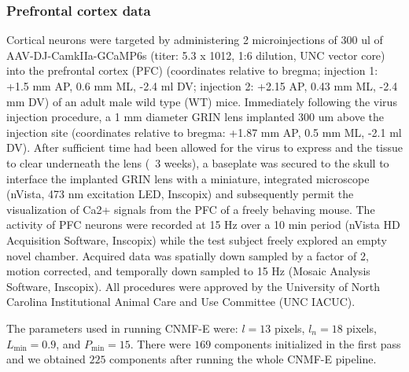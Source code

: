\documentclass[9pt,lineno]{elife}
\begin{document}

\subsubsection{Prefrontal cortex data}
Cortical neurons were targeted by administering 2 microinjections of 300 ul of AAV-DJ-CamkIIa-GCaMP6s (titer: 5.3 x 1012, 1:6 dilution, UNC vector core) into the prefrontal cortex (PFC) (coordinates relative to bregma; injection 1: +1.5 mm AP, 0.6 mm ML, -2.4 ml DV; injection 2: +2.15 AP, 0.43 mm ML, -2.4 mm DV) of an adult male wild type (WT) mice. Immediately following the virus injection procedure, a 1 mm diameter GRIN lens implanted 300 um above the injection site (coordinates relative to bregma: +1.87 mm AP, 0.5 mm ML, -2.1 ml DV). After sufficient time had been allowed for the virus to express and the tissue to clear underneath the lens (~3 weeks), a baseplate was secured to the skull to interface the implanted GRIN lens with a miniature, integrated microscope (nVista, 473 nm excitation LED, Inscopix) and subsequently permit the visualization of Ca2+ signals from the PFC of a freely behaving mouse. The activity of PFC neurons were recorded at 15 Hz over a 10 min period (nVista HD Acquisition Software, Inscopix) while the test subject freely explored an empty novel chamber. Acquired data was spatially down sampled by a factor of 2, motion corrected, and temporally down sampled to 15 Hz (Mosaic Analysis Software, Inscopix). All procedures were approved by the University of North Carolina Institutional Animal Care and Use Committee (UNC IACUC).

The parameters used in running CNMF-E were: $l=13$ pixels, $l_n=18$ pixels, $L_{\min}=0.9$, and $P_{\min}=15$. There were $169$ components initialized in the first pass and we obtained $225$ components after running the whole CNMF-E pipeline. %
\end{document}
